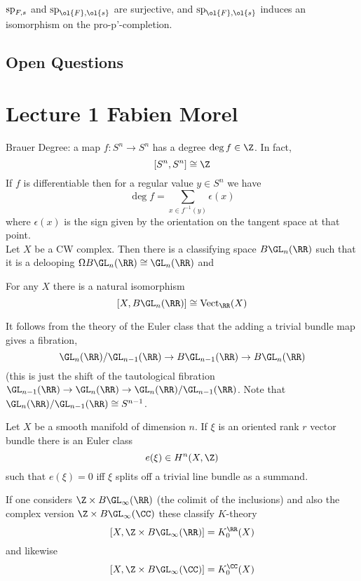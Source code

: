 \documentclass{article}
\newcommand{\Vect}{\mathrm{Vect}}
\begin{document}
\begin{theorem}
$\sp_{F,s}$ and $\sp_{\ol{F}, \ol{s}}$ are surjective, and $\sp_{\ol{F}, \ol{s}}$ induces an isomorphism on the pro-p'-completion. 
\end{theorem}


\subsection{Open Questions}



\section{Lecture 1 Fabien Morel}

Brauer Degree: a map $f : S^n \to S^n$ has a degree $\deg{f} \in \Z$. In fact, 
\[ [S^n, S^n] \cong \Z \]
If $f$ is differentiable then for a regular value $y \in S^n$ we have
\[ \deg{f} = \sum_{x \in f^{-1}(y)} \epsilon(x) \]
where $\epsilon(x)$ is the sign given by the orientation on the tangent space at that point. 
\bigskip\\
Let $X$ be a CW complex. Then there is a classifying space $B \GL_n(\RR)$ such that it is a delooping $\Omega B \GL_n(\RR) \cong \GL_n(\RR)$ and 
\begin{theorem}
For any $X$ there is a natural isomorphism
\[ [X, B \GL_n(\RR)] \cong \Vect_{\RR}(X) \]
\end{theorem}

It follows from the theory of the Euler class that the adding a trivial bundle map gives a fibration,
\[ \GL_n(\RR) / \GL_{n-1}(\RR) \to B \GL_{n-1}(\RR) \to B \GL_n(\RR) \]
(this is just the shift of the tautological fibration $\GL_{n-1}(\RR) \to \GL_n(\RR) \to \GL_n(\RR) / \GL_{n-1}(\RR)$. Note that $\GL_n(\RR) / \GL_{n-1}(\RR) \cong S^{n-1}$.

\begin{theorem}
Let $X$ be a smooth manifold of dimension $n$. If $\xi$ is an oriented rank $r$ vector bundle there is an Euler class
\[ e(\xi) \in H^n(X, \Z) \]
such that $e(\xi) = 0$ iff $\xi$ splits off a trivial line bundle as a summand. 
\end{theorem}

If one considers $\Z \times B \GL_{\infty}(\RR)$ (the colimit of the inclusions)
and also the complex version $\Z \times B \GL_{\infty}(\CC)$ these classify $K$-theory
\[ [X, \Z \times B \GL_{\infty}(\RR)] = K_0^{\RR}(X) \]
and likewise
\[ [X, \Z \times B \GL_{\infty}(\CC)] = K_0^{\CC}(X) \] 
\end{document}
